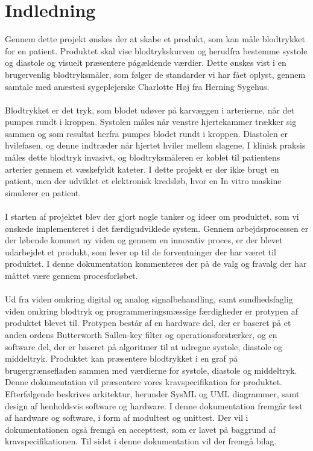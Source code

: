 \chapter{Indledning}
Gennem dette projekt ønskes der at skabe et produkt, som kan måle blodtrykket for en patient. Produktet skal vise blodtrykskurven og herudfra bestemme systole og diastole og visuelt præsentere pågældende værdier. Dette ønskes vist i en brugervenlig blodtryksmåler, som følger de standarder vi har fået oplyst, gennem samtale med anæstesi sygeplejerske Charlotte Høj fra Herning Sygehus. 
\\\\
Blodtrykket er det tryk, som blodet udøver på karvæggen i arterierne, når det pumpes rundt i kroppen. Systolen måles når venstre hjertekammer trækker sig sammen og som resultat herfra pumpes blodet rundt i kroppen. Diastolen er hvilefasen, og denne indtræder når hjertet hviler mellem slagene. I klinisk praksis måles dette blodtryk invasivt, og blodtryksmåleren er koblet til patientens arterier gennem et væskefyldt kateter. I dette projekt er der ikke brugt en patient, men der udviklet et elektronisk kredsløb, hvor en In vitro maskine simulerer en patient.
\\\\
I starten af projektet blev der gjort nogle tanker og ideer om produktet, som vi ønskede implementeret i det færdigudviklede system. Gennem arbejdsprocessen er der løbende kommet ny viden og gennem en innovativ proces, er der blevet udarbejdet et produkt, som lever op til de forventninger der har været til produktet. I denne dokumentation kommenteres der på de valg og fravalg der har måttet være gennem procesforløbet.  
\\\\
Ud fra viden omkring digital og analog signalbehandling, samt sundhedsfaglig viden omkring blodtryk og programmeringsmæssige færdigheder er protypen af produktet blevet til. Protypen består af en hardware del, der er baseret på et anden ordens Butterworth Sallen-key filter og operationsforstærker, og en software del, der er baseret på algoritmer til at udregne systole, diastole og middeltryk. Produktet kan præsentere blodtrykket i en graf på brugergrænsefladen sammen med værdierne for systole, diastole og middeltryk.\\
Denne dokumentation vil præsentere vores kravspecifikation for produktet. Efterfølgende beskrives arkitektur, herunder SysML og UML diagrammer, samt design af henholdsvis software og hardware. I denne dokumentation fremgår test af hardware og software, i form af modultest og unittest. Der vil i dokumentationen også fremgå en accepttest, som er lavet på baggrund af kravspecifikationen. Til sidst i denne dokumentation vil der fremgå bilag. 
